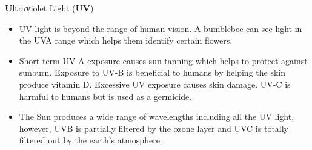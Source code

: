 {\Large {\bfseries U}ltra{\bfseries v}iolet Light ({\bfseries UV})}
\begin{itemize}
\item UV light is beyond the range of human vision. A bumblebee can see light in the UVA range which helps them identify certain flowers.



\item Short-term UV-A exposure causes sun-tanning which helps to protect against sunburn. Exposure to UV-B is beneficial to humans by helping the skin produce vitamin D. Excessive UV exposure causes skin damage. UV-C is harmful to humans but is used as a germicide.



\item The Sun produces a wide range of wavelengths including all the UV light, however, UVB is partially filtered by the ozone layer and UVC is totally filtered out by the earth's atmosphere.

\end{itemize}





